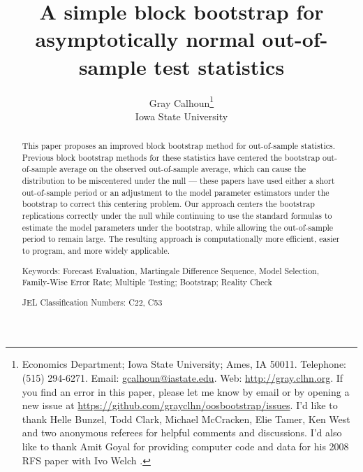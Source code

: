 \documentclass[12pt,fleqn]{article}
\begin{document}
\author{Gray Calhoun\thanks{Economics Department; Iowa State
    University; Ames, IA 50011.  Telephone: (515) 294-6271.  Email:
    \guillemotleft\protect\url{gcalhoun@iastate.edu}\guillemotright.  Web:
    \guillemotleft\protect\url{http://gray.clhn.org}\guillemotright.
    If you find an error in this paper, please let me know by email or
    by opening a new issue at
    \guillemotleft\protect\url{https://github.com/grayclhn/oosbootstrap/issues}\guillemotright.
    I'd like to thank Helle Bunzel, Todd Clark, Michael McCracken,
    Elie Tamer, Ken West and two anonymous referees for helpful
    comments and discussions.  I'd also like to thank Amit Goyal for
    providing computer code and data for his 2008 RFS paper with Ivo
    Welch \citep{GoW:08}.} \\
  Iowa State University}

\title{A simple block bootstrap for asymptotically normal
  out-of-sample test statistics}

\maketitle

\begin{abstract} \noindent%
  This paper proposes an improved block bootstrap method for
  out-of-sample statistics. Previous block bootstrap methods for these
  statistics have centered the bootstrap out-of-sample average on the
  observed out-of-sample average, which can cause the distribution to
  be miscentered under the null --- these papers have used either a
  short out-of-sample period or an adjustment to the model parameter
  estimators under the bootstrap to correct this centering
  problem. Our approach centers the bootstrap replications correctly
  under the null while continuing to use the standard formulas to
  estimate the model parameters under the bootstrap, while allowing
  the out-of-sample period to remain large. The resulting approach is
  computationally more efficient, easier to program, and more widely
  applicable.

\strut

\noindent Keywords: Forecast Evaluation, Martingale Difference
Sequence, Model Selection, Family-Wise Error Rate; Multiple Testing;
Bootstrap; Reality Check

\strut

\noindent JEL Classification Numbers: C22, C53

\end{abstract}
\end{document}
